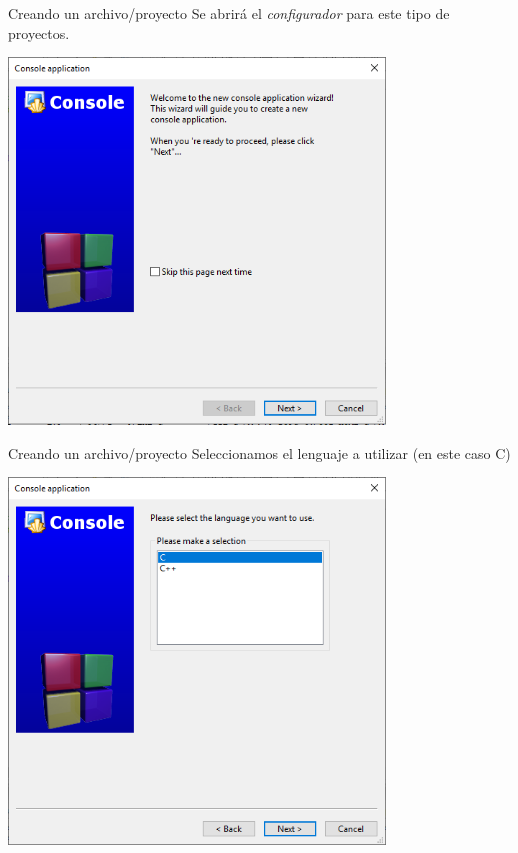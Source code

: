 \documentclass[11pt]{beamer}
\begin{document}
\begin{frame}{Creando un archivo/proyecto}
    \justifying
    Se abrirá el \emph{configurador} para este tipo de proyectos.
    
    \centering
    \includegraphics[width=0.75\textwidth]{cb26_1.png}
\end{frame}
\begin{frame}{Creando un archivo/proyecto}
    \justifying
    Seleccionamos el lenguaje a utilizar (en este caso C)
    
    \centering
    \includegraphics[width=0.75\textwidth]{cb27_1.png}
\end{frame}
\end{document}
